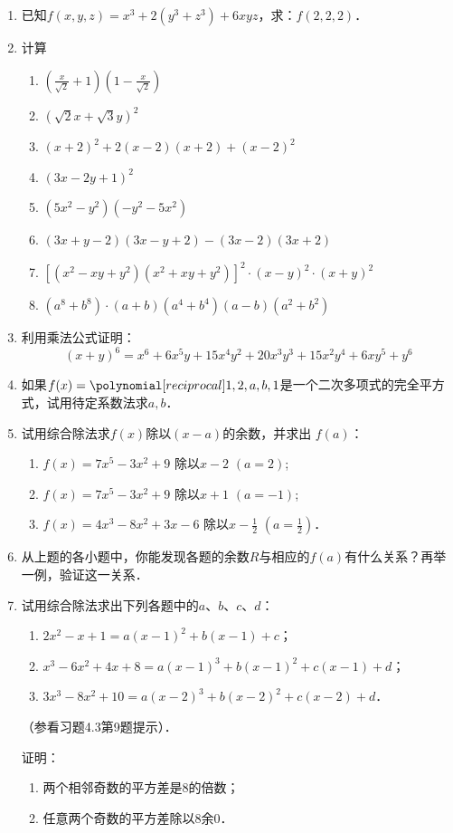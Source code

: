 \begin{enumerate}
\item 已知$f(x,y,z)=x^3+2(y^3+z^3)+6xyz$，求：$f(2,2,2)$．

\item 计算
\begin{enumerate}
    \item $\left(\frac{x}{\sqrt{2}}+1\right)\left(1-\frac{x}{\sqrt{2}}\right)$
    \item $\left(\sqrt{2}x+\sqrt{3}y\right)^2$
    \item $(x+2)^2+2(x-2)(x+2)+(x-2)^2$
    \item $(3x-2y+1)^2$
    \item $(5x^2-y^2)(-y^2-5x^2)$
    \item $(3x+y-2)(3x-y+2)-(3x-2)(3x+2)$
    \item $\left[(x^2-xy+y^2)(x^2+xy+y^2)\right]^2\cdot (x-y)^2\cdot (x+y)^2$
    \item $(a^8+b^8)\cdot (a+b)(a^4+b^4)(a-b)(a^2+b^2)$
\end{enumerate}

\item 利用乘法公式证明：
\[(x+y)^6=x^6+6x^5y+15x^4y^2+20x^3y^3+15x^2y^4+6xy^5+y^6\]
\item 如果$f(x)=\poly{1,2,a,b,1}$是一个二次多项式的完全平方式，试用待定系数法求$a,b$．
\item  试用综合除法求$f(x)$除以$(x-a)$的余数，并求出
$f (a)$：
\begin{enumerate}
    \item $f(x)=7x^5-3x^2+9$ 除以$x-2$ $(a=2)$;
    \item $f(x)=7x^5-3x^2+9$ 除以$x+1$ $(a=-1)$;
    \item $f(x)=4x^3-8x^2+3x-6$ 除以$x-\frac{1}{2}$ $(a=\frac{1}{2})$．
\end{enumerate}

\item 从上题的各小题中，你能发现各题的余数$R$与相应的$f(a)$有什么关系？再举一例，验证这一关系．
\item 试用综合除法求出下列各题中的$a$、$b$、$c$、$d$：
\begin{enumerate}
    \item $2x^2-x+1=a(x-1)^2+b(x-1)+c$；
    \item $x^3-6x^2+4x+8=a(x-1)^3+b(x-1)^2+c(x-1)+d$；
    \item $3x^3-8x^2+10=a(x-2)^3+b(x-2)^2+c(x-2)+d$．
\end{enumerate}
（参看习题4.3第9题提示）．

\staritem 证明：
\begin{enumerate}
    \item 两个相邻奇数的平方差是8的倍数；
    \item 任意两个奇数的平方差除以8余0．
\end{enumerate}


\end{enumerate}
